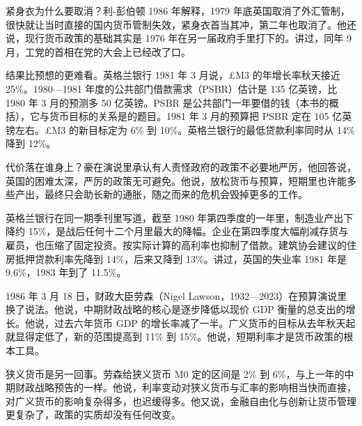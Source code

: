 紧身衣为什么要取消？利-彭伯顿 1986 年解释，1979 年底英国取消了外汇管制，很快就让当时直接的国内货币管制失效，紧身衣首当其冲，第二年也取消了\cite{leighpemberton1986}。他还说，现行货币政策的基础其实是 1976 年在另一届政府手里打下的\cite{leighpemberton1986}。讲过，同年 9 月，工党的首相在党的大会上已经改了口。

结果比预想的更难看。英格兰银行 1981 年 3 月说，£M3 的年增长率秋天接近 25\%\cite{boe1981}。1980—1981 年度的公共部门借款需求（PSBR）估计是 135 亿英镑，比 1980 年 3 月的预测多 50 亿英镑\cite{boe1981}。PSBR 是公共部门一年要借的钱（本书的概括），它与货币目标的关系是的题目。1981 年 3 月的预算把 PSBR 定在 105 亿英镑左右\cite{boe1981}。£M3 的新目标定为 6\% 到 10\%\cite{boe1981}。英格兰银行的最低贷款利率同时从 14\% 降到 12\%\cite{boe1981}。

代价落在谁身上？豪在演说里承认有人责怪政府的政策不必要地严厉，他回答说，英国的困难太深，严厉的政策无可避免\cite{hansard1980}。他说，放松货币与预算，短期里也许能多些产出，最终只会助长新的通胀，随之而来的危机会毁掉更多的工作\cite{hansard1980}。

英格兰银行在同一期季刊里写道，截至 1980 年第四季度的一年里，制造业产出下降约 15\%，是战后任何十二个月里最大的降幅\cite{boe1981}。企业在第四季度大幅削减存货与雇员，也压缩了固定投资\cite{boe1981}。按实际计算的高利率也抑制了借款\cite{boe1981}。建筑协会建议的住房抵押贷款利率先降到 14\%，后来又降到 13\%\cite{boe1981}。讲过，英国的失业率 1981 年是 9.6\%，1983 年到了 11.5\%。

1986 年 3 月 18 日，财政大臣劳森（Nigel Lawson，1932—2023）在预算演说里换了说法\cite{hansard1986,loc45,gnd45}。他说，中期财政战略的核心是逐步降低以现价 GDP 衡量的总支出的增长\cite{hansard1986}。他说，过去六年货币 GDP 的增长率减了一半\cite{hansard1986}。广义货币的目标从去年秋天起就显得定低了，新的范围提高到 11\% 到 15\%\cite{hansard1986}。他说，短期利率才是货币政策的根本工具\cite{hansard1986}。

狭义货币是另一回事。劳森给狭义货币 M0 定的区间是 2\% 到 6\%，与上一年的中期财政战略预告的一样\cite{hansard1986}。他说，利率变动对狭义货币与汇率的影响相当快而直接，对广义货币的影响复杂得多，也迟缓得多\cite{hansard1986}。他又说，金融自由化与创新让货币管理更复杂了，政策的实质却没有任何改变\cite{hansard1986}。

